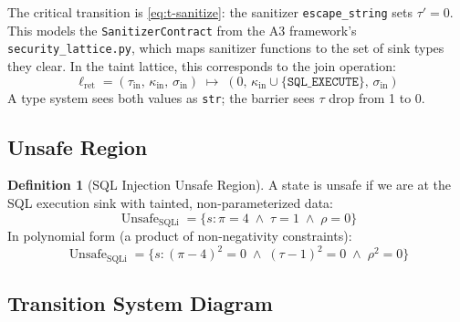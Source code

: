 \documentclass[11pt,a4paper]{article}
\theoremstyle{plain}
\theoremstyle{definition}
\newtheorem{definition}[theorem]{Definition}
\theoremstyle{remark}
\newcommand{\Unsafe}{\operatorname{Unsafe}}
\begin{document}
\begin{keyinsight}
The critical transition is \eqref{eq:t-sanitize}: the sanitizer
\texttt{escape\_string} sets $\tau' = 0$.  This models the
\texttt{SanitizerContract} from the A3 framework's
\texttt{security\_lattice.py}, which maps sanitizer functions to the
set of sink types they clear.  In the taint lattice, this corresponds
to the join operation:
\[
  \ell_{\text{ret}} = (\tau_{\text{in}},\, \kappa_{\text{in}},\,
  \sigma_{\text{in}}) \;\mapsto\;
  (0,\, \kappa_{\text{in}} \cup \{\texttt{SQL\_EXECUTE}\},\, \sigma_{\text{in}})
\]
A type system sees both values as \texttt{str}; the barrier sees $\tau$
drop from 1 to 0.
\end{keyinsight}

\subsection{Unsafe Region}

\begin{definition}[SQL Injection Unsafe Region]
A state is unsafe if we are at the SQL execution sink with tainted,
non-parameterized data:
\begin{equation}
  \Unsafe_{\text{SQLi}} = \bigl\{s :
    \pi = 4 \;\wedge\;
    \tau = 1 \;\wedge\;
    \rho = 0
  \bigr\}
\end{equation}
In polynomial form (a product of non-negativity constraints):
\begin{equation}
  \Unsafe_{\text{SQLi}} = \bigl\{s :
    (\pi - 4)^2 = 0 \;\wedge\;
    (\tau - 1)^2 = 0 \;\wedge\;
    \rho^2 = 0
  \bigr\}
\end{equation}
\end{definition}

\subsection{Transition System Diagram}
\end{document}
